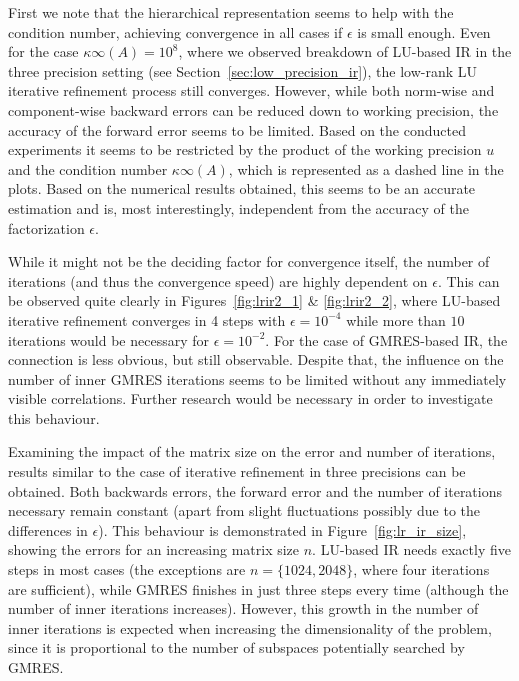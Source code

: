 First we note that the hierarchical representation seems to help with the condition number, achieving convergence in all cases if $\epsilon$ is small enough. Even for the case $\kappa\infty(A)=10^8$, where we observed breakdown of LU-based IR in the three precision setting (see Section~\hyperref[sec:low_precision_ir]{\ref{sec:low_precision_ir}}), the low-rank LU iterative refinement process still converges. However, while both norm-wise and component-wise backward errors can be reduced down to working precision, the accuracy of the forward error seems to be limited. Based on the conducted experiments it seems to be restricted by the product of the working precision $u$ and the condition number $\kappa\infty(A)$, which is represented as a dashed line in the plots. Based on the numerical results obtained, this seems to be an accurate estimation and is, most interestingly, independent from the accuracy of the factorization $\epsilon$.

While it might not be the deciding factor for convergence itself, the number of iterations (and thus the convergence speed) are highly dependent on $\epsilon$. This can be observed quite clearly in Figures~\hyperref[fig:lrir2_1]{\ref{fig:lrir2_1}} \& \hyperref[fig:lrir2_2]{\ref{fig:lrir2_2}}, where LU-based iterative refinement converges in 4 steps with $\epsilon = 10^{-4}$ while more than $10$ iterations would be necessary for $\epsilon = 10^{-2}$. For the case of GMRES-based IR, the connection is less obvious, but still observable. Despite that, the influence on the number of inner GMRES iterations seems to be limited without any immediately visible correlations. Further research would be necessary in order to investigate this behaviour.

Examining the impact of the matrix size on the error and number of iterations, results similar to the case of iterative refinement in three precisions can be obtained. Both backwards errors, the forward error and the number of iterations necessary remain constant (apart from slight fluctuations possibly due to the differences in $\epsilon$). This behaviour is demonstrated in Figure~\hyperref[fig:lr_ir_size]{\ref{fig:lr_ir_size}}, showing the errors for an increasing matrix size $n$. LU-based IR needs exactly five steps in most cases (the exceptions are $n = \{1024, 2048\}$, where four iterations are sufficient), while GMRES finishes in just three steps every time (although the number of inner iterations increases). However, this growth in the number of inner iterations is expected when increasing the dimensionality of the problem, since it is proportional to the number of subspaces potentially searched by GMRES. 

